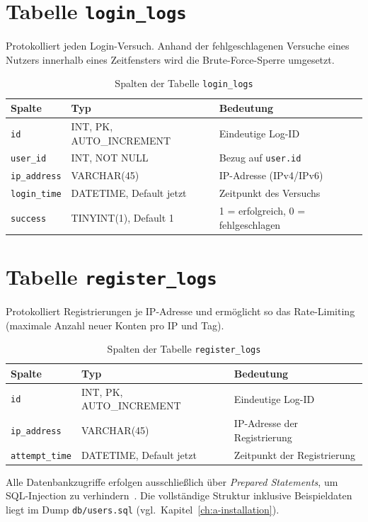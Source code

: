 \section{Tabelle \texttt{login\_logs}}
Protokolliert jeden Login-Versuch. Anhand der fehlgeschlagenen Versuche eines Nutzers innerhalb
eines Zeitfensters wird die Brute-Force-Sperre umgesetzt.

\begin{table}[htbp]
\centering
\caption{Spalten der Tabelle \texttt{login\_logs}}
\label{tab:db-loginlogs}
\begin{tabularx}{\textwidth}{@{}l l X@{}}
\toprule
\textbf{Spalte} & \textbf{Typ} & \textbf{Bedeutung} \\
\midrule
\texttt{id}         & INT, PK, AUTO\_INCREMENT & Eindeutige Log-ID \\
\texttt{user\_id}   & INT, NOT NULL            & Bezug auf \texttt{user.id} \\
\texttt{ip\_address}& VARCHAR(45)              & IP-Adresse (IPv4/IPv6) \\
\texttt{login\_time}& DATETIME, Default jetzt  & Zeitpunkt des Versuchs \\
\texttt{success}    & TINYINT(1), Default 1    & 1 = erfolgreich, 0 = fehlgeschlagen \\
\bottomrule
\end{tabularx}
\end{table}

\section{Tabelle \texttt{register\_logs}}
Protokolliert Registrierungen je IP-Adresse und erm\"oglicht so das Rate-Limiting (maximale Anzahl
neuer Konten pro IP und Tag).

\begin{table}[htbp]
\centering
\caption{Spalten der Tabelle \texttt{register\_logs}}
\label{tab:db-registerlogs}
\begin{tabularx}{\textwidth}{@{}l l X@{}}
\toprule
\textbf{Spalte} & \textbf{Typ} & \textbf{Bedeutung} \\
\midrule
\texttt{id}           & INT, PK, AUTO\_INCREMENT & Eindeutige Log-ID \\
\texttt{ip\_address}  & VARCHAR(45)              & IP-Adresse der Registrierung \\
\texttt{attempt\_time}& DATETIME, Default jetzt  & Zeitpunkt der Registrierung \\
\bottomrule
\end{tabularx}
\end{table}

Alle Datenbankzugriffe erfolgen ausschlie\ss{}lich \"uber \emph{Prepared Statements}, um
SQL-Injection zu verhindern~\autocite{php-preparedstatements}. Die vollst\"andige Struktur
inklusive Beispieldaten liegt im Dump \texttt{db/users.sql} (vgl.\ Kapitel~\ref{ch:a-installation}).
